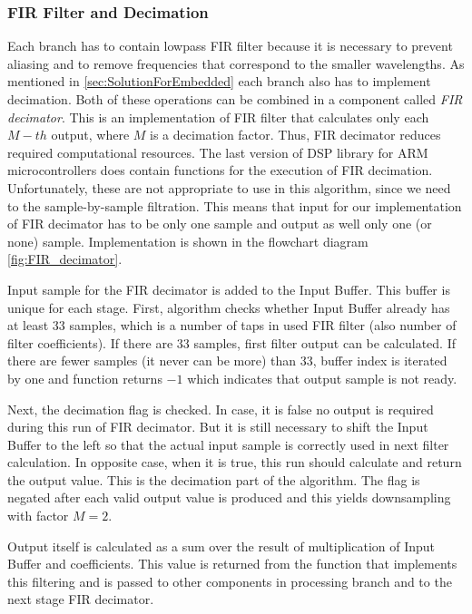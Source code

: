 \documentclass[twoside]{ctuthesis}
\theoremstyle{plain}
\theoremstyle{definition}
\theoremstyle{note}
\begin{document}
\subsubsection{FIR Filter and Decimation}
\label{FIR filter}
Each branch has to contain lowpass FIR filter because it is necessary to prevent aliasing and to remove frequencies that correspond to the smaller wavelengths. As mentioned in \ref{sec:SolutionForEmbedded} each branch also has to implement decimation. Both of these operations can be combined in a component called \textit{FIR decimator}. This is an implementation of FIR filter that calculates only each $M-th$ output, where $M$ is a decimation factor. Thus, FIR decimator reduces required computational resources. 
The last version of DSP library for ARM microcontrollers does contain functions for the execution of FIR decimation. Unfortunately, these are not appropriate to use in this algorithm, since we need to the sample-by-sample filtration. This means that input for our implementation of FIR decimator has to be only one sample and output as well only one (or none) sample. Implementation is shown in the flowchart diagram \ref{fig:FIR_decimator}.

Input sample for the FIR decimator is added to the Input Buffer. This buffer is unique for each stage. First, algorithm checks whether Input Buffer already has at least 33 samples, which is a number of taps in used FIR filter (also number of filter coefficients). If there are 33 samples, first filter output can be calculated. If there are fewer samples (it never can be more) than 33, buffer index is iterated by one and function returns $-1$ which indicates that output sample is not ready.

Next, the decimation flag is checked. In case, it is false no output is required during this run of FIR decimator. But it is still necessary to shift the Input Buffer to the left so that the actual input sample is correctly used in next filter calculation. In opposite case, when it is true, this run should calculate and return the output value. This is the decimation part of the algorithm. The flag is negated after each valid output value is produced and this yields downsampling with factor $M=2$.

Output itself is calculated as a sum over the result of multiplication of Input Buffer and coefficients. This value is returned from the function that implements this filtering and is passed to other components in processing branch and to the next stage FIR decimator.
\end{document}
